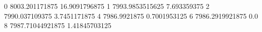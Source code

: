 0 8003.201171875 16.9091796875
1 7993.9853515625 7.693359375
2 7990.037109375 3.7451171875
4 7986.9921875 0.7001953125
6 7986.2919921875 0.0
8 7987.71044921875 1.41845703125
